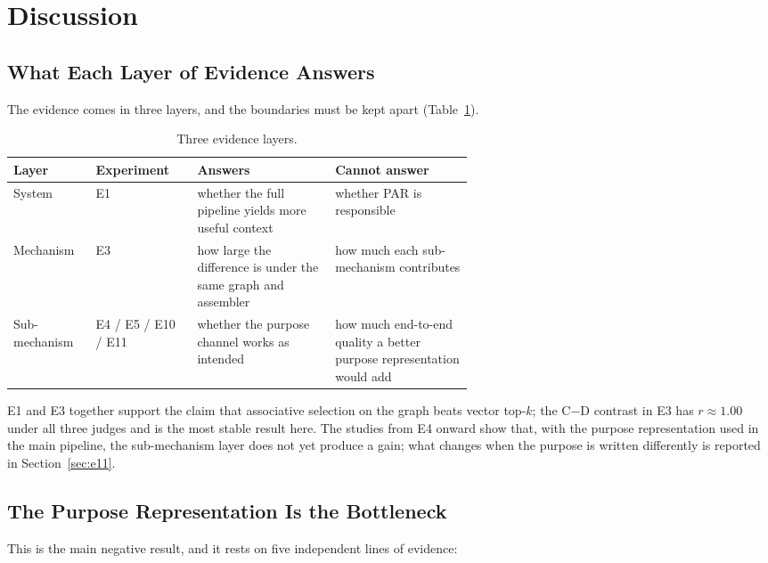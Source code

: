 \documentclass[11pt]{article}
\begin{document}
\section{Discussion}
\label{sec:discussion}

\subsection{What Each Layer of Evidence Answers}
\label{sec:layers}

The evidence comes in three layers, and the boundaries must be kept apart
(Table~\ref{tab:layers}).

\begin{table}[t]
  \centering
  \small
  \begin{tabular}{@{}llp{0.3\linewidth}p{0.3\linewidth}@{}}
    \toprule
    Layer & Experiment & Answers & Cannot answer \\
    \midrule
    System & E1 & whether the full pipeline yields more useful context & whether PAR is responsible \\
    Mechanism & E3 & how large the difference is under the same graph and assembler &
      how much each sub-mechanism contributes \\
    Sub-mechanism & E4 / E5 / E10 / E11 & whether the purpose channel works as intended &
      how much end-to-end quality a better purpose representation would add \\
    \bottomrule
  \end{tabular}
  \caption{Three evidence layers.}\label{tab:layers}
\end{table}

E1 and E3 together support the claim that associative selection on the graph beats vector
top-$k$; the C$-$D contrast in E3 has $r\approx1.00$ under all three judges and is the most
stable result here. The studies from E4 onward show that, with the purpose representation used
in the main pipeline, the sub-mechanism layer does not yet produce a gain; what changes when the
purpose is written differently is reported in Section~\ref{sec:e11}.

\subsection{The Purpose Representation Is the Bottleneck}
\label{sec:bottleneck}

This is the main negative result, and it rests on five independent lines of evidence:
\end{document}
